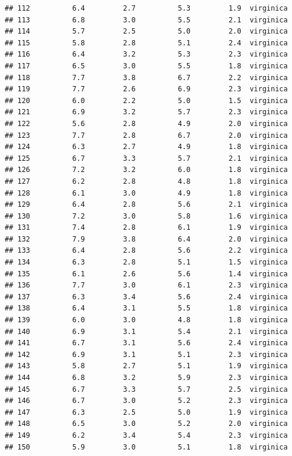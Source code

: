 \documentclass[
]{article}
\begin{document}
\begin{verbatim}
## 112          6.4         2.7          5.3         1.9  virginica
## 113          6.8         3.0          5.5         2.1  virginica
## 114          5.7         2.5          5.0         2.0  virginica
## 115          5.8         2.8          5.1         2.4  virginica
## 116          6.4         3.2          5.3         2.3  virginica
## 117          6.5         3.0          5.5         1.8  virginica
## 118          7.7         3.8          6.7         2.2  virginica
## 119          7.7         2.6          6.9         2.3  virginica
## 120          6.0         2.2          5.0         1.5  virginica
## 121          6.9         3.2          5.7         2.3  virginica
## 122          5.6         2.8          4.9         2.0  virginica
## 123          7.7         2.8          6.7         2.0  virginica
## 124          6.3         2.7          4.9         1.8  virginica
## 125          6.7         3.3          5.7         2.1  virginica
## 126          7.2         3.2          6.0         1.8  virginica
## 127          6.2         2.8          4.8         1.8  virginica
## 128          6.1         3.0          4.9         1.8  virginica
## 129          6.4         2.8          5.6         2.1  virginica
## 130          7.2         3.0          5.8         1.6  virginica
## 131          7.4         2.8          6.1         1.9  virginica
## 132          7.9         3.8          6.4         2.0  virginica
## 133          6.4         2.8          5.6         2.2  virginica
## 134          6.3         2.8          5.1         1.5  virginica
## 135          6.1         2.6          5.6         1.4  virginica
## 136          7.7         3.0          6.1         2.3  virginica
## 137          6.3         3.4          5.6         2.4  virginica
## 138          6.4         3.1          5.5         1.8  virginica
## 139          6.0         3.0          4.8         1.8  virginica
## 140          6.9         3.1          5.4         2.1  virginica
## 141          6.7         3.1          5.6         2.4  virginica
## 142          6.9         3.1          5.1         2.3  virginica
## 143          5.8         2.7          5.1         1.9  virginica
## 144          6.8         3.2          5.9         2.3  virginica
## 145          6.7         3.3          5.7         2.5  virginica
## 146          6.7         3.0          5.2         2.3  virginica
## 147          6.3         2.5          5.0         1.9  virginica
## 148          6.5         3.0          5.2         2.0  virginica
## 149          6.2         3.4          5.4         2.3  virginica
## 150          5.9         3.0          5.1         1.8  virginica
\end{verbatim}
\end{document}

